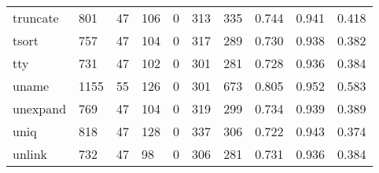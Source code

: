 \begin{longtable}{lp{2.0cm}p{2.0cm}p{2.0cm}p{2.0cm}p{2.0cm}p{2.0cm}p{2.0cm}p{2.0cm}p{2.0cm}}
truncate  &                    801 &                                 47 &                               106 &                                0 &                               313 &                             335 &                                0.744 &                                  0.941 &                                0.418 \\
tsort     &                    757 &                                 47 &                               104 &                                0 &                               317 &                             289 &                                0.730 &                                  0.938 &                                0.382 \\
tty       &                    731 &                                 47 &                               102 &                                0 &                               301 &                             281 &                                0.728 &                                  0.936 &                                0.384 \\
uname     &                   1155 &                                 55 &                               126 &                                0 &                               301 &                             673 &                                0.805 &                                  0.952 &                                0.583 \\
unexpand  &                    769 &                                 47 &                               104 &                                0 &                               319 &                             299 &                                0.734 &                                  0.939 &                                0.389 \\
uniq      &                    818 &                                 47 &                               128 &                                0 &                               337 &                             306 &                                0.722 &                                  0.943 &                                0.374 \\
unlink    &                    732 &                                 47 &                                98 &                                0 &                               306 &                             281 &                                0.731 &                                  0.936 &                                0.384 \\

\end{longtable}
